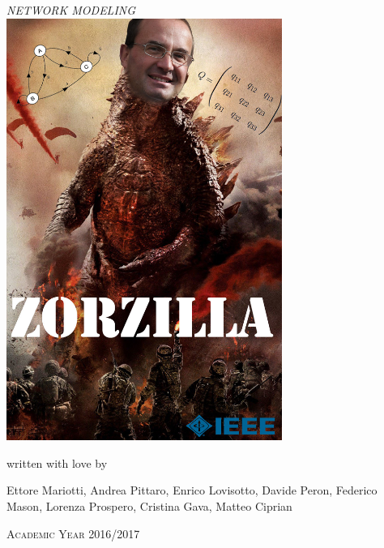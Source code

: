 \documentclass[a4paper, 12pt, twoside, openright, fleqn]{book}
\theoremstyle{theoremdd}
\theoremstyle{remark}
\begin{document}
\frontmatter

\begin{titlepage} %
\begin{center}

\hspace{0.5cm}

\emph{\Large{NETWORK MODELING}} \\
\vspace{1cm}
\includegraphics[width=9cm]{Zorzilla}\\
\vspace{0.5cm}
{written with love by\par}
{\Large Ettore Mariotti, Andrea Pittaro, Enrico Lovisotto, Davide Peron, Federico Mason, Lorenza Prospero, Cristina Gava, Matteo Ciprian\par}
\end{center}

\vfill
\begin{center}
\noindent\makebox[\linewidth]{\rule{\textwidth}{0.4pt}}
\textsc{Academic Year 2016/2017}
\end{center}
\end{titlepage}

\begingroup %
  \makeatletter
  \let\ps@plain\ps@empty
  \makeatother
  \tableofcontents
  \clearpage
\endgroup
\mainmatter






\end{document}
